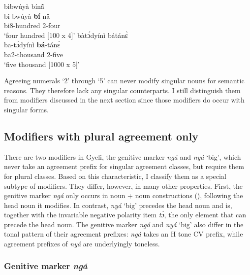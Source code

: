 
\ex
\glll bìbwúyà bínã̂ \\
bi-bwúyà {\bfseries bí}-nã̂\\ 
bi8-hundred 2-four \\
\glt `four hundred [100 x 4]'
\ex
\glll bàtɔ́dyínì bátánɛ̀ \\
ba-tɔ́dyínì {\bfseries bá}-tánɛ̀ \\
   ba2-thousand 2-five \\
\glt `five thousand [1000 x 5]'
\z
\z


Agreeing numerals `2' through `5' can never modify singular nouns for semantic reasons. They therefore lack any singular counterparts. I still distinguish them from modifiers discussed in the next section since those modifiers do occur with singular forms.
















\subsection{Modifiers with plural agreement only}
\label{sec:MODAgrPL}
 

There are two modifiers in Gyeli, the genitive marker {\itshape ngá} and {\itshape nyá} ‘big’,
which never take an agreement prefix for singular agreement classes, but require them for plural classes. Based on this characteristic, I classify them as a special subtype of modifiers. They differ, however, in many other properties. First, the genitive marker {\itshape ngá} only occurs in noun + noun constructions (), following the head noun it modifies. In contrast, {\itshape nyá} `big' precedes the head noun and is, together with the invariable negative polarity item {\itshape tɔ̀}, the only element that can precede the head noun. The genitive marker {\itshape ngá} and {\itshape nyá} `big' also differ in the tonal pattern of their agreement prefixes: {\itshape ngá} takes an H tone CV prefix, while agreement prefixes of {\itshape nyá} are underlyingly toneless. 





\subsubsection{Genitive marker {\itshape ngá}}
\label{sec:GEN}

